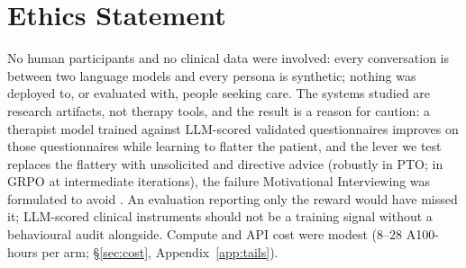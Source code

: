 \section*{Ethics Statement}

No human participants and no clinical data were involved: every conversation is between two
language models and every persona is synthetic; nothing was deployed to, or evaluated with,
people seeking care. The systems studied are research artifacts, not therapy tools, and the
result is a reason for caution: a therapist model trained against LLM-scored validated
questionnaires improves on those questionnaires while learning to flatter the patient, and the
lever we test replaces the flattery with unsolicited and directive advice (robustly in PTO; in
GRPO at intermediate iterations), the failure
Motivational Interviewing was formulated to avoid \citep{miller1991mi}. An evaluation reporting
only the reward would have missed it; LLM-scored clinical instruments should not be a training
signal without a behavioural audit alongside. Compute and API cost were modest ($8$--$28$
A100-hours per arm; \S\ref{sec:cost}, Appendix~\ref{app:tails}).
